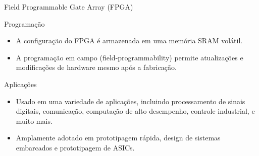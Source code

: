 \documentclass[aspectratio=169]{beamer}
\begin{document}
\begin{frame}{Field Programmable Gate Array (FPGA)}
	\justifying
	

	
	
	
	\begin{block}{Programação}
		\justifying
		\begin{itemize}
			\item A configuração do FPGA é armazenada em uma memória SRAM volátil.
			\item A programação em campo (field-programmability) permite atualizações e modificações de hardware mesmo após a fabricação.
		\end{itemize}
		
	\end{block}		
	
	
	\begin{block}{Aplicações}
		\justifying
		\begin{itemize}
			\item Usado em uma variedade de aplicações, incluindo processamento de sinais digitais, comunicação, computação de alto desempenho, controle industrial, e muito mais.
			\item Amplamente adotado em prototipagem rápida, design de sistemas embarcados e prototipagem de ASICs.
		\end{itemize}
		
	\end{block}		
	
	
	
%		
%	
	
	
\end{frame}
\end{document}
